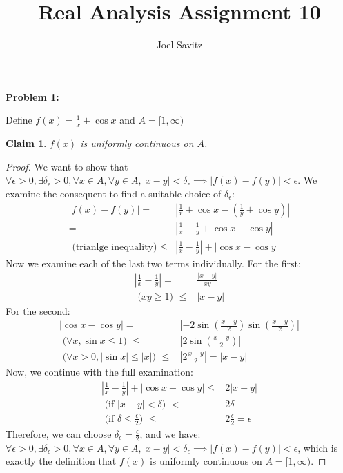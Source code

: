 \documentclass{article}
\title{Real Analysis Assignment 10}
\author{Joel Savitz}
\newcommand{\eps}{\ensuremath{\epsilon}}
\newcommand{\pt}[1]{\textrm{ #1 }}
\newtheorem{clm}{Claim}
\begin{document}
\maketitle

\textbf{Problem 1:}

Define $f(x) = \frac{1}{x} + \cos x$ and $A = [1,\infty)$

\begin{clm}
	$f(x)$ is uniformly continuous on $A$.
\end{clm}

\begin{proof}
	We want to show that
	$\forall \eps > 0,
	\exists \delta_\eps > 0,
	\forall x \in A, \forall y \in A,
	|x - y| < \delta_\eps
	\implies |f(x) - f(y)| < \eps$.
	We examine the consequent to find a suitable choice of $\delta_\eps$:
	\begin{align}
		|f(x) - f(y)| = & |\frac{1}{x} + \cos x - (\frac{1}{y} + \cos y)| \\
		= & |\frac{1}{x} - \frac{1}{y} + \cos x - \cos y| \\
		\pt{(trianlge inequality)} \le & |\frac{1}{x} - \frac{1}{y}| + |\cos x - \cos y|
	\end{align}
	Now we examine each of the last two terms individually. For the first:
	\begin{align}
		|\frac{1}{x} - \frac{1}{y}| = & \frac{|x - y|}{xy} \\
		\pt{($xy \geq 1$)} \le & |x - y|
	\end{align}
	For the second:
	\begin{align}
		|\cos x - \cos y| = & |-2 \sin(\frac{x - y}{2})\sin(\frac{x - y}{2})| \\
		\pt{($\forall x, \sin x \le 1$)} \le & |2 \sin(\frac{x - y}{2})| \\
		\pt{($\forall x > 0, | \sin x | \le |x|$)} \le & |2 \frac{x - y}{2}| = |x - y|
	\end{align}
	Now, we continue with the full examination:
	\begin{align}
		|\frac{1}{x} - \frac{1}{y}| + |\cos x - \cos y| \le & 2|x - y| \\
		\pt{(if $|x - y| < \delta$)} < & 2\delta \\
		\pt{(if $\delta \le \frac{\eps}{2}$)} \le & 2 \frac{\eps}{2} = \eps
	\end{align}
	Therefore, we can choose $\delta_\eps = \frac{\eps}{2}$,
	and we have:
	$\forall \eps > 0,
	\exists \delta_\eps > 0,
	\forall x \in A, \forall y \in A,
	|x - y| < \delta_\eps
	\implies |f(x) - f(y)| < \eps$,
	which is exactly the definition that
	$f(x)$ is uniformly continuous on $A = [1, \infty)$.
\end{proof}
\end{document}
